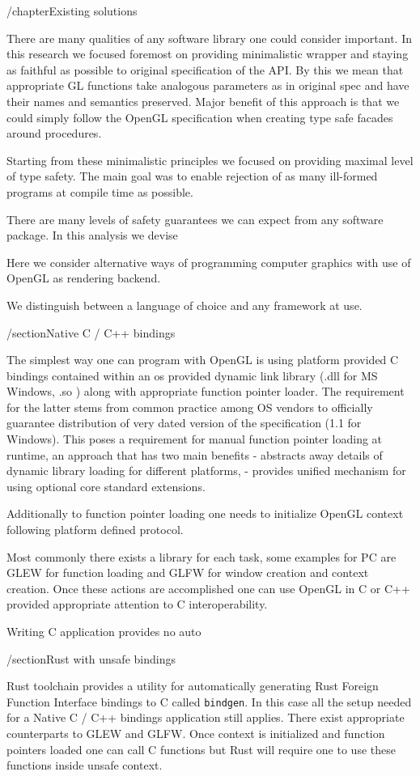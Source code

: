 /chapter{Existing solutions}


There are many qualities of any software library one could consider important.
In this research we focused foremost on providing minimalistic wrapper and staying as faithful as possible to original specification of the API.
By this we mean that appropriate GL functions take analogous parameters as in original spec and have their names and semantics preserved.
Major benefit of this approach is that we could simply follow the OpenGL specification when creating type safe facades around procedures.

Starting from these minimalistic principles we focused on providing maximal level of type safety. The main goal was to enable rejection of as many ill-formed programs at compile time as possible.



There are many levels of safety guarantees we can expect from any software package.
In this analysis we devise 


Here we consider alternative ways of programming computer graphics with use of OpenGL as rendering backend.

We distinguish between a language of choice and any framework at use. 

/section{Native C / C++ bindings}

The simplest way one can program with OpenGL is using platform provided C bindings contained within an os provided dynamic link library (.dll for MS Windows, .so ) along with appropriate function pointer loader.
The requirement for the latter stems from common practice among OS vendors to officially guarantee distribution of very dated version of the specification (1.1 for Windows).
This poses a requirement for manual function pointer loading at runtime, an approach that has two main benefits
- abstracts away details of dynamic library loading for different platforms, 
- provides unified mechanism for using optional core standard extensions.

Additionally to function pointer loading one needs to initialize OpenGL context following platform defined protocol.

Most commonly there exists a library for each task, some examples for PC are GLEW for function loading and GLFW for window creation and context creation.
Once these actions are accomplished one can use OpenGL in C or C++ provided appropriate attention to C interoperability.

Writing C application provides no auto

/section{Rust with unsafe bindings}

Rust toolchain provides a utility for automatically generating Rust Foreign Function Interface bindings to C called \texttt{bindgen}.
In this case all the setup needed for a Native C / C++ bindings application still applies. There exist appropriate counterparts to GLEW and GLFW.
Once context is initialized and function pointers loaded one can call C functions but Rust will require one to use these functions inside unsafe context.


